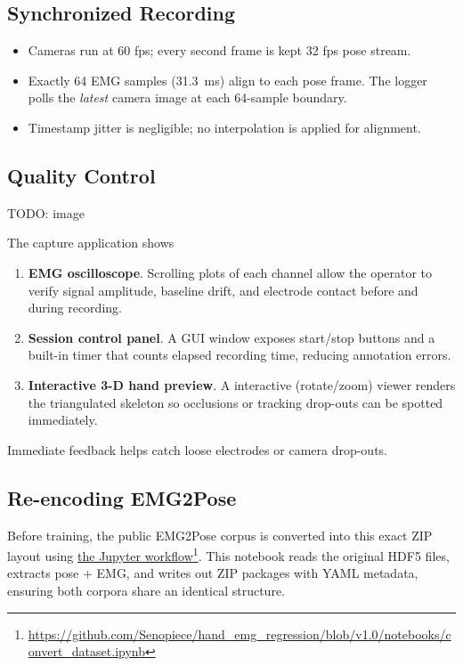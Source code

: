 \subsection{Synchronized Recording}

\begin{itemize}
  \item Cameras run at 60 fps; every second frame is kept 32 fps pose stream.
  \item Exactly 64 EMG samples (\SI{31.3}{ms}) align to each pose frame. The
        logger polls the \emph{latest} camera image at each 64-sample boundary.
  \item Timestamp jitter is negligible; no interpolation is
        applied for alignment.
\end{itemize}

\subsection{Quality Control}

TODO: image

The capture application shows

\begin{enumerate}[label=\alph*]
    \item \textbf{EMG oscilloscope}.
          Scrolling plots of each channel allow the operator to verify signal amplitude, baseline drift, and electrode contact before and during recording.
    \item \textbf{Session control panel}.
          A GUI window exposes start/stop buttons and a built-in timer that counts elapsed recording time, reducing annotation errors.
    \item \textbf{Interactive 3-D hand preview}.
          A interactive (rotate/zoom) viewer renders the triangulated skeleton so occlusions or tracking drop-outs can be spotted immediately.
\end{enumerate}

Immediate feedback helps catch loose electrodes or camera drop-outs.

\subsection{Re-encoding EMG2Pose}
Before training, the public EMG2Pose corpus is converted into this exact ZIP
layout using \href{https://github.com/Senopiece/hand_emg_regression/blob/v1.0/notebooks/convert_dataset.ipynb}{the Jupyter workflow}\footnote{\url{https://github.com/Senopiece/hand_emg_regression/blob/v1.0/notebooks/convert_dataset.ipynb}}. This notebook reads the original HDF5
files, extracts pose + EMG, and writes out ZIP packages with YAML metadata,
ensuring both corpora share an identical structure.

